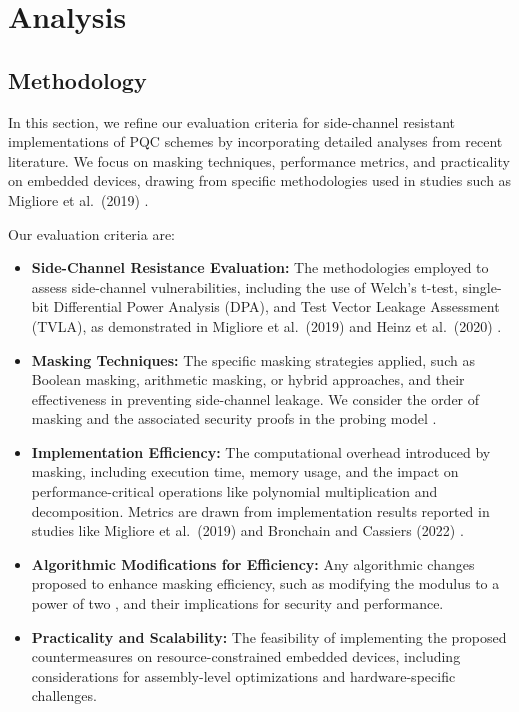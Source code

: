 
\chapter{Analysis}
\thispagestyle{chapterstart}

\section{Methodology}

In this section, we refine our evaluation criteria for side-channel resistant implementations of \ac{PQC} schemes by incorporating detailed analyses from recent literature. We focus on masking techniques, performance metrics, and practicality on embedded devices, drawing from specific methodologies used in studies such as Migliore et al.\ (2019) \cite{Migliore19}.

Our evaluation criteria are:

\begin{itemize}
    \item \textbf{Side-Channel Resistance Evaluation:} The methodologies employed to assess side-channel vulnerabilities, including the use of Welch's t-test, single-bit Differential Power Analysis (DPA), and Test Vector Leakage Assessment (TVLA), as demonstrated in Migliore et al.\ (2019) \cite{Migliore19} and Heinz et al.\ (2020) \cite{Heinz20}.
    \item \textbf{Masking Techniques:} The specific masking strategies applied, such as Boolean masking, arithmetic masking, or hybrid approaches, and their effectiveness in preventing side-channel leakage. We consider the order of masking and the associated security proofs in the probing model \cite{Migliore19}.
    \item \textbf{Implementation Efficiency:} The computational overhead introduced by masking, including execution time, memory usage, and the impact on performance-critical operations like polynomial multiplication and decomposition. Metrics are drawn from implementation results reported in studies like Migliore et al.\ (2019) \cite{Migliore19} and Bronchain and Cassiers (2022) \cite{Bronchain22}.
    \item \textbf{Algorithmic Modifications for Efficiency:} Any algorithmic changes proposed to enhance masking efficiency, such as modifying the modulus to a power of two \cite{Migliore19}, and their implications for security and performance.
    \item \textbf{Practicality and Scalability:} The feasibility of implementing the proposed countermeasures on resource-constrained embedded devices, including considerations for assembly-level optimizations and hardware-specific challenges.
\end{itemize}

